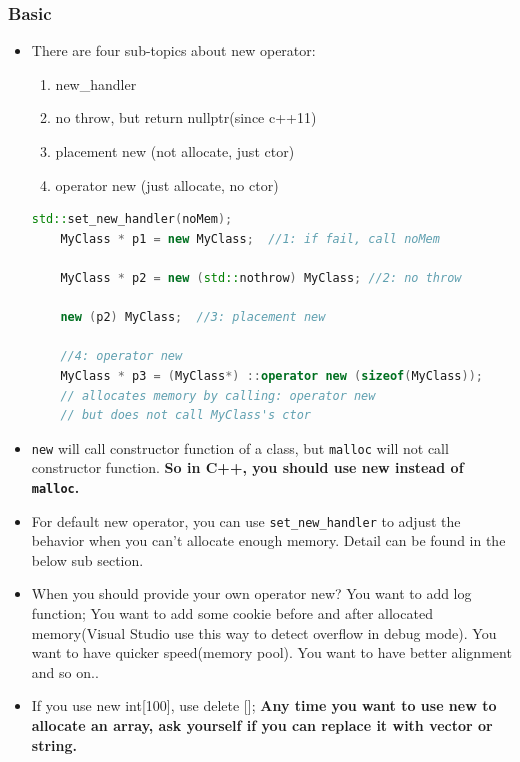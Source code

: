 \documentclass[a4paper,12pt,twoside]{book}
\begin{document}
\subsubsection{Basic}
\begin{itemize}
	
	\item There are four sub-topics about new operator:
	\begin{enumerate}
		\item new\_handler
		\item no throw, but return nullptr(since c++11)
		\item placement new (not allocate, just ctor)
		\item operator new (just allocate, no ctor)
	\end{enumerate}
	
	\begin{lstlisting}[frame=single, language=c++]
	std::set_new_handler(noMem);
	MyClass * p1 = new MyClass;  //1: if fail, call noMem
	
	MyClass * p2 = new (std::nothrow) MyClass; //2: no throw
	
	new (p2) MyClass;  //3: placement new
	
	//4: operator new
	MyClass * p3 = (MyClass*) ::operator new (sizeof(MyClass));
	// allocates memory by calling: operator new
	// but does not call MyClass's ctor
	\end{lstlisting}
	
	\item \texttt{new} will call constructor function of a class, but \texttt{malloc} will not call constructor function.  \textbf{So in C++, you should use new instead of \texttt{malloc}.}
	
	\item For default new operator, you can use \texttt{set\_new\_handler} to adjust the behavior when you can't allocate enough memory. Detail can be found in the below sub section.
	
	\item When you should provide your own operator new?  You want to add log function; You want to add some cookie before and after allocated memory(Visual Studio use this way to detect overflow in debug mode). You want to have quicker speed(memory pool). You want to have better alignment and so on..
	
	\item If you use new int[100], use delete [];  \textbf{Any time you want to use new to allocate an array, ask yourself if you can replace it with vector or string.}
\end{itemize}
\end{document}
